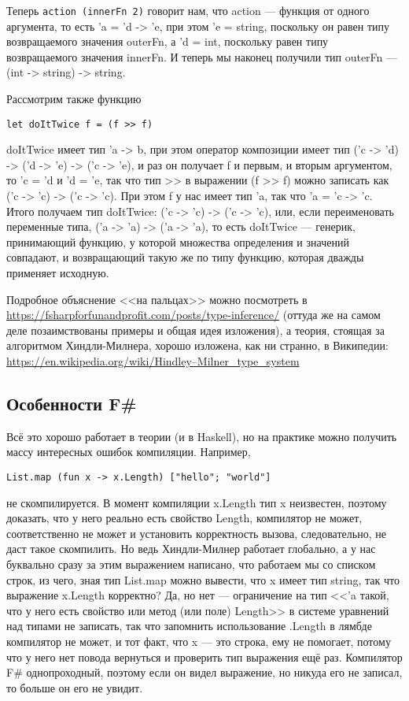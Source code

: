 \documentclass[a5paper]{article}
\begin{document}
Теперь \texttt{action (innerFn 2)} говорит нам, что action --- функция от одного аргумента, то есть 'a = 'd -> 'e, при этом 'e = string, поскольку он равен типу возвращаемого значения outerFn, а 'd = int, поскольку равен типу возвращаемого значения innerFn. И теперь мы наконец получили тип outerFn --- (int -> string) -> string.

Рассмотрим также функцию

\begin{verbatim}
let doItTwice f = (f >> f)
\end{verbatim}

doItTwice имеет тип 'a -> b, при этом оператор композиции имеет тип ('c -> 'd) -> ('d -> 'e) -> ('c -> 'e), и раз он получает f и первым, и вторым аргументом, то 'c = 'd и 'd = 'e, так что тип >> в выражении (f >> f) можно записать как ('c -> 'c) -> ('c -> 'c). При этом f у нас имеет тип 'a, так что 'a = 'c -> 'c. Итого получаем тип doItTwice: ('c -> 'c) -> ('c -> 'c), или, если переименовать переменные типа, ('a -> 'a) -> ('a -> 'a), то есть doItTwice --- генерик, принимающий функцию, у которой множества определения и значений совпадают, и возвращающий такую же по типу функцию, которая дважды применяет исходную.

Подробное объяснение <<на пальцах>> можно посмотреть в \url{https://fsharpforfunandprofit.com/posts/type-inference/} (оттуда же на самом деле позаимствованы примеры и общая идея изложения), а теория, стоящая за алгоритмом Хиндли-Милнера, хорошо изложена, как ни странно, в Википедии: \url{https://en.wikipedia.org/wiki/Hindley–Milner_type_system}

\subsection{Особенности F\#}

Всё это хорошо работает в теории (и в Haskell), но на практике можно получить массу интересных ошибок компиляции. Например,

\begin{verbatim}
List.map (fun x -> x.Length) ["hello"; "world"]
\end{verbatim}

не скомпилируется. В момент компиляции x.Length тип x неизвестен, поэтому доказать, что у него реально есть свойство Length, компилятор не может, соответственно не может и установить корректность вызова, следовательно, не даст такое скомпилить. Но ведь Хиндли-Милнер работает глобально, а у нас буквально сразу за этим выражением написано, что работаем мы со списком строк, из чего, зная тип List.map можно вывести, что x имеет тип string, так что выражение x.Length корректно? Да, но нет --- ограничение на тип <<'a такой, что у него есть свойство или метод (или поле) Length>> в системе уравнений над типами не записать, так что запомнить использование .Length в лямбде компилятор не может, и тот факт, что x --- это строка, ему не помогает, потому что у него нет повода вернуться и проверить тип выражения ещё раз. Компилятор F\# однопроходный, поэтому если он видел выражение, но никуда его не записал, то больше он его не увидит.
\end{document}
